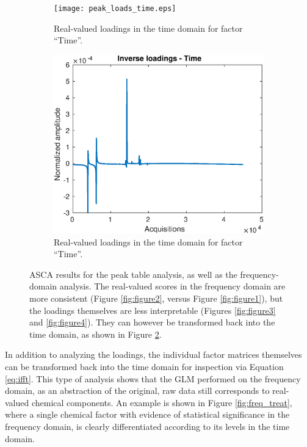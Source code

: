 \documentclass[preprint,12pt]{elsarticle}
\begin{document}
\begin{figure}[hbtp!]
\begin{subfigure}[b]{0.45\textwidth}
        \centering
        \texttt{[image: peak\_loads\_time.eps]}
        \caption{Real-valued loadings in the time domain for factor ``Time''.}
        \label{fig:figure5}
    \end{subfigure}
    \hfill
    \begin{subfigure}[b]{0.45\textwidth}
        \centering
        \includegraphics[width=\textwidth]{time_peaks.eps}
        \caption{Real-valued loadings in the time domain for factor ``Time''.}
        \label{fig:figure6}
    \end{subfigure}
    \caption{ASCA results for the peak table analysis, as well as the frequency-domain analysis. The real-valued scores in the frequency domain are more consistent (Figure \ref{fig:figure2}, versus Figure \ref{fig:figure1}), but the loadings themselves are less interpretable (Figures \ref{fig:figure3} and \ref{fig:figure4}). They can however be transformed back into the time domain, as shown in Figure \ref{fig:figure6}.}
    \label{fig:subfigures}
\end{figure}

In addition to analyzing the loadings, the individual factor matrices themselves can be transformed back into the time domain for  inspection via Equation \ref{eq:ifft}. This type of analysis shows that the GLM performed on the frequency domain, as an abstraction of the original, raw data still corresponds to real-valued chemical components. An example is shown in Figure \ref{fig:freq_treat}, where a single chemical factor with evidence of statistical significance in the frequency domain, is clearly differentiated according to its levels in the time domain.
\end{document}

